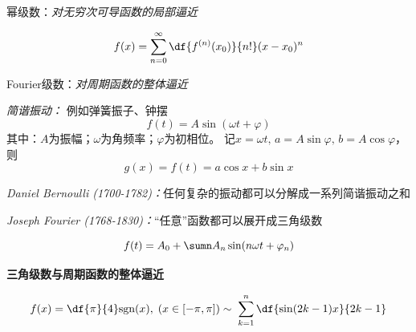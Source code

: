 幂级数：{\it 对无穷次可导函数的局部逼近}

$${f(x)=\sum\limits_{n=0}^{\infty}\df{f^{(n)}(x_0)}{n!}(x-x_0)^n}$$
\begin{center}
\end{center}

Fourier级数：{\it 对周期函数的整体逼近}


{\it 简谐振动：} 例如弹簧振子、钟摆
$$f(t)=A\sin(\omega t+\varphi)$$
其中：$A$为振幅；$\omega$为角频率；$\varphi$为初相位。
记$x=\omega t,\,a=A\sin\varphi,\,b=A\cos\varphi$， 则
$${g(x)=f(t)=a\cos x+b\sin x}$$

{\it Daniel Bernoulli (1700-1782)：}任何复杂的振动都可以分解成一系列简谐振动之和

{\it Joseph Fourier (1768-1830)：}“任意”函数都可以展开成三角级数

$${f(t)=A_0+\sumn A_n\sin(n\omega t+\varphi_n)}$$

{\bf 三角级数与周期函数的整体逼近}

$${f(x)=\df{\pi}{4}\mathrm{sgn}(x),\;(x\in[-\pi,\pi])
\;{\sim\;\sum\limits_{k=1}^n\df{\sin(2k-1)x}{2k-1}}}$$

